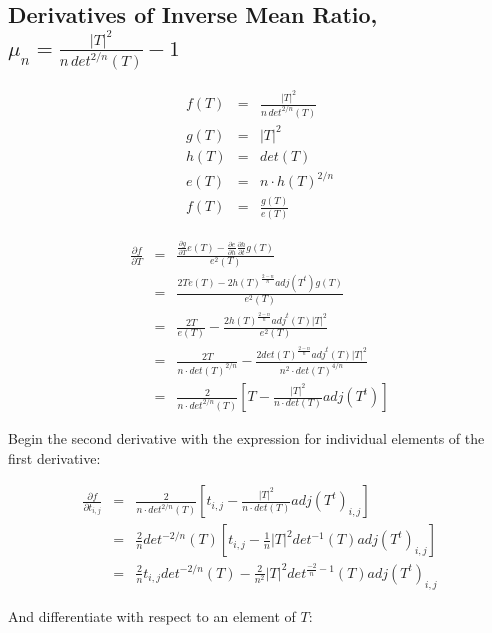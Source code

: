 \documentclass{report}
\begin{document}
\subsection{Derivatives of Inverse Mean Ratio, $\mu_n = \frac{|T|^2}{n \, det^{2/n}(T)}-1$ \label{imr}}

\begin{eqnarray}
f(T) & = & \frac{|T|^2}{n \, det^{2/n}(T)} \\
g(T) & = & |T|^2 \\
h(T) & = & det(T) \\
e(T) & = & n \cdot h(T)^{2/n} \\
f(T) & = & \frac{g(T)}{e(T)} 
\end{eqnarray}
 
\begin{eqnarray}
\frac{\partial f}{\partial T} &=& \frac{
\frac{\partial g}{\partial T} e(T) - 
\frac{\partial e}{\partial h} \frac{\partial h}{\partial t} g(T)}
{e^2(T)} \\
&=& 
\frac{2 T e(T) - 
2 h(T)^\frac{2-n}{n} adj(T^t) g(T)}
{e^2(T)} \\
& = &  
\frac{2 T}{e(T)} -
\frac{2 h(T)^{\frac{2-n}{n}} adj^t(T) |T|^2}{e^2(T)} \\
& = &  
\frac{2 T}{n \cdot det(T)^{2/n}} -
\frac{2 det(T)^{\frac{2-n}{n}} adj^t(T) |T|^2}{n^2 \cdot det(T)^{4/n}} \\
& = &  
\frac{2}{n \cdot det^{2/n}(T)}\left[ T - \frac{|T|^2}{n \cdot det(T)} adj(T^t) \right]
\end{eqnarray}

\noindent Begin the second derivative with the  expression for individual elements of the first derivative:

\begin{eqnarray}
\frac{\partial f}{\partial t_{i,j}} & = & 
\frac{2}{n \cdot det^{2/n}(T)}\left[ t_{i,j} - \frac{|T|^2}{n \cdot det(T)} adj(T^t)_{i,j} \right] \\
 & = & 
\frac{2}{n}det^{-2/n}(T)\left[ t_{i,j} - \frac{1}{n}|T|^2 det^{-1}(T) adj(T^t)_{i,j}\right] \\
 & = &
\frac{2}{n} t_{i,j} det^{-2/n}(T) - \frac{2}{n^2} |T|^2 det^{\frac{-2}{n} - 1}(T) adj(T^t)_{i,j} 
\end{eqnarray}

\noindent And differentiate with respect to an element of $T$:
\end{document}
